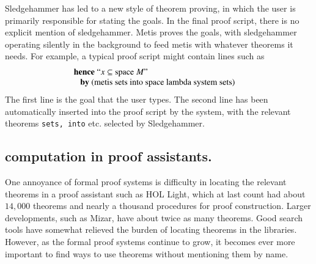 \documentclass{llncs}
\begin{document}

Sledgehammer has led to a new style of theorem proving, in which the
user is primarily responsible for stating the goals.  In the final
proof script, there is no explicit mention of sledgehammer.  Metis
proves the goals, with sledgehammer operating silently in the
background to feed metis with whatever theorems it needs.  For
example, a typical proof script might contain lines such as
\cite{Paar}
\[
\begin{array}{ll}
\text{{\bf hence} ``$x \subseteq \text{space}~M$''}\\
\text{~~~{\bf by} (metis sets into space lambda system sets)}&
\end{array}
\]
The first line is the goal that the user types. The second line has been
automatically inserted into the proof script by the system, with the relevant
theorems {\tt sets, into} etc. selected by Sledgehammer.






\subsection{computation in proof assistants.}

One annoyance of formal proof systems is difficulty in locating the
relevant theorems in a proof assistant such as HOL Light, which at
last count had about $14,000$ theorems and nearly a thousand
procedures for proof construction.  Larger developments, such as
Mizar, have about twice as many theorems.  Good search tools have
somewhat relieved the burden of locating theorems in the libraries.
However, as the formal proof systems continue to grow, it becomes ever
more important to find ways to use theorems without mentioning them by
name.


\end{document}
